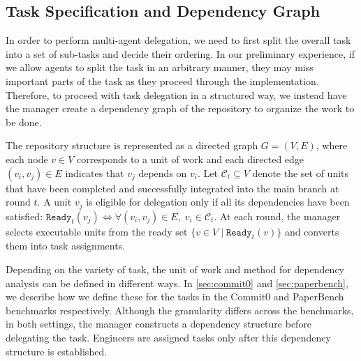 \subsection{Task Specification and Dependency Graph}
\label{sec:task-spec-dep-graph}

In order to perform multi-agent delegation, we need to first split the overall task into a set of sub-tasks and decide their ordering.
In our preliminary experience, if we allow agents to split the task in an arbitrary manner, they may miss important parts of the task as they proceed through the implementation. 
Therefore, to proceed with task delegation in a structured way, we instead have the manager create a dependency graph of the repository to organize the work to be done.

The repository structure is represented as a directed graph $G = (V, E)$, where each node $v \in V$ corresponds to a unit of work and each directed edge $(v_i, v_j) \in E$ indicates that $v_j$ depends on $v_i$.
Let $\mathcal{C}_t \subseteq V$ denote the set of units that have been completed and successfully integrated into the main branch at round $t$. A unit $v_j$ is eligible for delegation only if all its dependencies have been satisfied:
$\texttt{Ready}_t(v_j) \iff \forall (v_i, v_j) \in E,\; v_i \in \mathcal{C}_t$.
At each round, the manager selects executable units from the ready set $\{ v \in V \mid \texttt{Ready}_t(v) \}$ and converts them into task assignments.

Depending on the variety of task, the unit of work and method for dependency analysis can be defined in different ways.
In \autoref{sec:commit0} and \autoref{sec:paperbench}, we describe how we define these for the tasks in the Commit0 and PaperBench benchmarks respectively. Although the granularity differs across the benchmarks, in both settings, the manager constructs a dependency structure before delegating the task. Engineers are assigned tasks only after this dependency structure is established.

